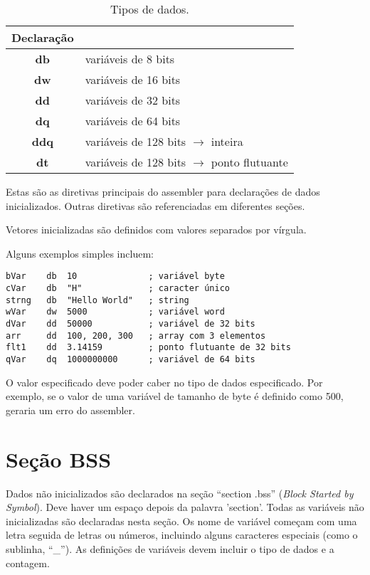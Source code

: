 \begin{table}[]
	\centering
	\begin{tabular}{|c|l|}
		\hline
		\rowcolor[HTML]{C0C0C0} 
		{\color[HTML]{000000} } Declaração & {\color[HTML]{000000} } \\ \hline
		\textbf{db}& variáveis de 8 bits \\ \hline
		\textbf{dw} & variáveis de 16 bits\\ \hline
		\textbf{dd} & variáveis de 32 bits\\ \hline
		\textbf{dq} & variáveis de 64 bits\\ \hline
		\textbf{ddq} & variáveis de 128 bits $\rightarrow$ inteira\\ \hline
		\textbf{dt} & variáveis de 128 bits $\rightarrow$ ponto flutuante\\ \hline
	\end{tabular}
\caption{Tipos de dados.}
\label{tab:tiposDeDados}
\end{table}

Estas são as diretivas principais do assembler para declarações de dados inicializados. Outras diretivas são referenciadas em diferentes seções.

Vetores inicializadas são definidos com valores separados por vírgula.

Alguns exemplos simples incluem:

\begin{verbatim}
bVar    db  10              ; variável byte
cVar    db  "H"             ; caracter único
strng   db  "Hello World"   ; string
wVar    dw 	5000            ; variável word
dVar    dd 	50000           ; variável de 32 bits
arr     dd 	100, 200, 300   ; array com 3 elementos
flt1    dd 	3.14159         ; ponto flutuante de 32 bits
qVar    dq 	1000000000      ; variável de 64 bits
\end{verbatim}

O valor especificado deve poder caber no tipo de dados especificado. Por exemplo, se o valor de uma variável de tamanho de byte é definido como 500, geraria um erro do assembler.

\section{Seção BSS}
Dados não inicializados são declarados na seção ``section .bss'' (\textit{Block Started by Symbol}). Deve haver um espaço depois da palavra 'section'. Todas as 
variáveis não inicializadas são declaradas nesta seção. Os nome de variável começam com uma letra seguida de letras ou números, incluindo alguns caracteres especiais (como o sublinha, ``\_''). As definições de variáveis devem incluir o tipo de dados e a contagem.

